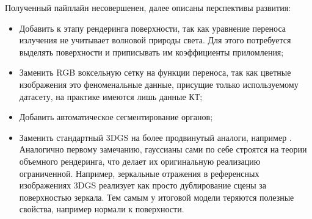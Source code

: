 Полученный пайплайн несовершенен, далее описаны перспективы развития:
%
\begin{itemize}
	\item Добавить к этапу рендеринга поверхности, так как уравнение переноса излучения не учитывает волновой природы света. Для этого потребуется выделять поверхности и приписывать им коэффициенты приломления;
	\item Заменить RGB воксельную сетку на функции переноса, так как цветные изображения это феноменальные данные, присущие только используемому датасету, на практике имеются лишь данные КТ;
	\item Добавить автоматическое сегментирование органов;
	\item Заменить стандартный 3DGS на более продвинутый аналоги, например \cite{jiang2023gaussianshader3dgaussiansplatting}. Аналогично первому замечанию, гауссианы сами по себе строятся на теории объемного рендеринга, что делает их оригинальную реализацию ограниченной. Например, зеркальные отражения в референсных изображениях 3DGS реализует как просто дублирование сцены за поверхностью зеркала. Тем самым у итоговой модели теряются полезные свойства, например нормали к поверхности.
\end{itemize}